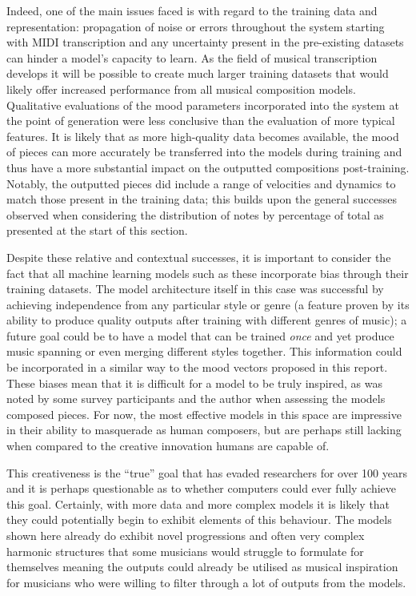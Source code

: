 \documentclass[12pt,]{article}
\begin{document}
Indeed, one of the main issues faced is with regard to the training data
and representation: propagation of noise or errors throughout the system
starting with MIDI transcription and any uncertainty present in the
pre-existing datasets can hinder a model's capacity to learn. As the
field of musical transcription develops it will be possible to create
much larger training datasets that would likely offer increased
performance from all musical composition models. Qualitative evaluations
of the mood parameters incorporated into the system at the point of
generation were less conclusive than the evaluation of more typical
features. It is likely that as more high-quality data becomes available,
the mood of pieces can more accurately be transferred into the models
during training and thus have a more substantial impact on the outputted
compositions post-training. Notably, the outputted pieces did include a
range of velocities and dynamics to match those present in the training
data; this builds upon the general successes observed when considering
the distribution of notes by percentage of total as presented at the
start of this section.

Despite these relative and contextual successes, it is important to
consider the fact that all machine learning models such as these
incorporate bias through their training datasets. The model architecture
itself in this case was successful by achieving independence from any
particular style or genre (a feature proven by its ability to produce
quality outputs after training with different genres of music); a future
goal could be to have a model that can be trained \emph{once} and yet
produce music spanning or even merging different styles together. This
information could be incorporated in a similar way to the mood vectors
proposed in this report. These biases mean that it is difficult for a
model to be truly inspired, as was noted by some survey participants and
the author when assessing the models composed pieces. For now, the most
effective models in this space are impressive in their ability to
masquerade as human composers, but are perhaps still lacking when
compared to the creative innovation humans are capable of.

This creativeness is the ``true'' goal that has evaded researchers for
over 100 years and it is perhaps questionable as to whether computers
could ever fully achieve this goal. Certainly, with more data and more
complex models it is likely that they could potentially begin to exhibit
elements of this behaviour. The models shown here already do exhibit
novel progressions and often very complex harmonic structures that some
musicians would struggle to formulate for themselves meaning the outputs
could already be utilised as musical inspiration for musicians who were
willing to filter through a lot of outputs from the models.
\end{document}
